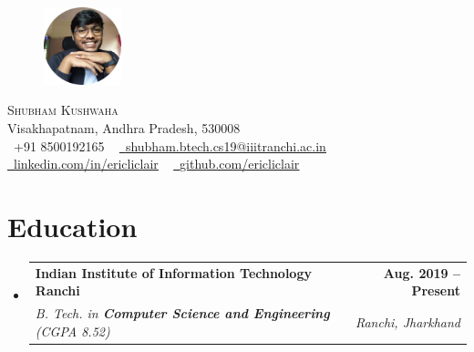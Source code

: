 \documentclass[letterpaper,11pt]{article}
\makeatletter
\newcommand{\resumeSubheading}[4]{
  \vspace{-2pt}\item
    \begin{tabular*}{1.0\textwidth}[t]{l@{\extracolsep{\fill}}r}
      \textbf{#1} & \textbf{\small #2} \\
      \textit{\small#3} & \textit{\small #4} \\
    \end{tabular*}\vspace{-7pt}
}
\newcommand{\resumeSubHeadingListStart}{\begin{itemize}[leftmargin=0.0in, label={}]}
\newcommand{\resumeSubHeadingListEnd}{\end{itemize}}
\makeatother
\begin{document}

    \begin{figure}
        {\vspace*{-0.07\textwidth}\includegraphics[width=0.2\textwidth]{images/profile.png}}
    \end{figure}
    {\Huge \scshape Shubham Kushwaha} \\ \vspace{1pt}
    Visakhapatnam, Andhra Pradesh, 530008 \\ \vspace{1pt}
    \small \raisebox{-0.1\height}\faPhone\ +91 8500192165 ~ \href{mailto:eric.liclair@gmail.com}{\raisebox{-0.2\height}\faEnvelope\  \underline{shubham.btech.cs19@iiitranchi.ac.in}} ~
    \href{https://linkedin.com/in//}{\raisebox{-0.2\height}\faLinkedin\ \underline{linkedin.com/in/ericliclair}}  ~
    \href{https://github.com/}{\raisebox{-0.2\height}\faGithub\ \underline{github.com/ericliclair}}
    \vspace{-8pt}


\section{Education}
  \resumeSubHeadingListStart
    \resumeSubheading
      {Indian Institute of Information Technology Ranchi}{Aug. 2019 -- Present}
      {B. Tech. in \textbf{Computer Science and Engineering} (CGPA 8.52)}{Ranchi, Jharkhand}
  \resumeSubHeadingListEnd

\end{document}
